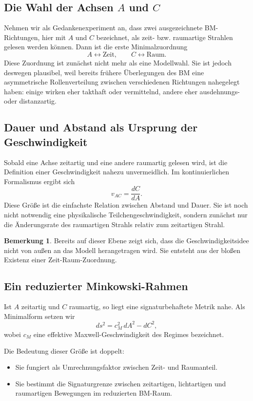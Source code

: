 \documentclass[11pt,a4paper]{article}
\theoremstyle{definition}
\newtheorem{bemerkung}[definition]{Bemerkung}
\theoremstyle{plain}
\begin{document}
	\subsection{Die Wahl der Achsen $A$ und $C$}
	
	Nehmen wir als Gedankenexperiment an, dass zwei ausgezeichnete BM-Richtungen, hier mit $A$ und $C$ bezeichnet, als zeit- bzw. raumartige Strahlen gelesen werden können. Dann ist die erste Minimalzuordnung
	\[
	A \leftrightarrow \text{Zeit},
	\qquad
	C \leftrightarrow \text{Raum}.
	\]
	Diese Zuordnung ist zunächst nicht mehr als eine Modellwahl. Sie ist jedoch deswegen plausibel, weil bereits frühere Überlegungen des BM eine asymmetrische Rollenverteilung zwischen verschiedenen Richtungen nahegelegt haben: einige wirken eher takthaft oder vermittelnd, andere eher ausdehnungs- oder distanzartig.
	
	\subsection{Dauer und Abstand als Ursprung der Geschwindigkeit}
	
	Sobald eine Achse zeitartig und eine andere raumartig gelesen wird, ist die Definition einer Geschwindigkeit nahezu unvermeidlich. Im kontinuierlichen Formalismus ergibt sich
	\[
	v_{AC} = \frac{dC}{dA}.
	\]
	Diese Größe ist die einfachste Relation zwischen Abstand und Dauer. Sie ist noch nicht notwendig eine physikalische Teilchengeschwindigkeit, sondern zunächst nur die Änderungsrate des raumartigen Strahls relativ zum zeitartigen Strahl.
	
	\begin{bemerkung}
		Bereits auf dieser Ebene zeigt sich, dass die Geschwindigkeitsidee nicht von außen an das Modell herangetragen wird. Sie entsteht aus der bloßen Existenz einer Zeit-Raum-Zuordnung.
	\end{bemerkung}
	
	\subsection{Ein reduzierter Minkowski-Rahmen}
	
	Ist $A$ zeitartig und $C$ raumartig, so liegt eine signaturbehaftete Metrik nahe. Als Minimalform setzen wir
	\[
	ds^2 = c_M^2\, dA^2 - dC^2,
	\]
	wobei $c_M$ eine effektive Maxwell-Geschwindigkeit des Regimes bezeichnet.
	
	Die Bedeutung dieser Größe ist doppelt:
	\begin{itemize}[leftmargin=2em]
		\item Sie fungiert als Umrechnungsfaktor zwischen Zeit- und Raumanteil.
		\item Sie bestimmt die Signaturgrenze zwischen zeitartigen, lichtartigen und raumartigen Bewegungen im reduzierten BM-Raum.
	\end{itemize}
	
\end{document}
